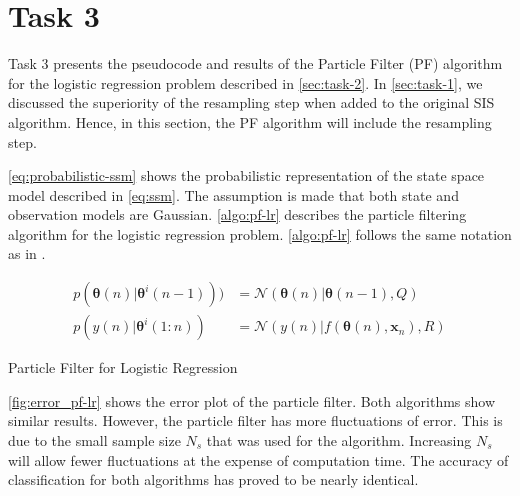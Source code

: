 \documentclass{article}
\begin{document}
\section{Task 3}

Task 3 presents the pseudocode and results of the Particle Filter (PF) algorithm for the logistic regression problem described in \cref{sec:task-2}. In \cref{sec:task-1}, we discussed the superiority of the resampling step when added to the original SIS algorithm. Hence, in this section, the PF algorithm will include the resampling step.

\cref{eq:probabilistic-ssm} shows the probabilistic representation of the state space model described in \cref{eq:ssm}. The assumption is made that both state and observation models are Gaussian. \cref{algo:pf-lr} describes the particle filtering algorithm for the logistic regression problem. \cref{algo:pf-lr} follows the same notation as in \cite{lecture6}.

\begin{equation}
    \begin{split}
        p(\pmb{\theta}(n) | \pmb{\theta}^i (n-1))) &= \mathcal{N} (\pmb{\theta}(n) | \pmb{\theta}(n-1), Q)\\
        p(y(n) | \pmb{\theta}^i(1:n)) &= \mathcal{N} (y(n) | f(\pmb{\theta}(n), \pmb{x}_n), R) 
    \end{split}
    \label{eq:probabilistic-ssm}
\end{equation}


\begin{algorithm}[H]
    \SetAlgoLined
     \caption{Particle Filter for Logistic Regression}
     \label{algo:pf-lr}
\end{algorithm}

\cref{fig:error_pf-lr} shows the error plot of the particle filter. Both algorithms show similar results. However, the particle filter has more fluctuations of error. This is due to the small sample size $N_s$ that was used for the algorithm. Increasing $N_s$ will allow fewer fluctuations at the expense of computation time. The accuracy of classification for both algorithms has proved to be nearly identical.
\end{document}
